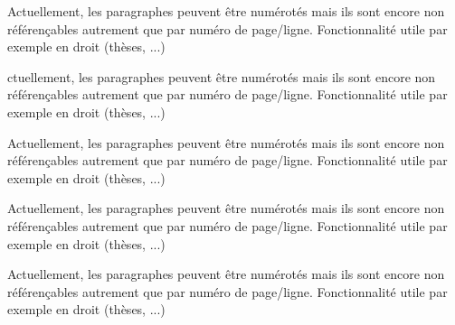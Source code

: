 \documentclass{article}
\begin{document}
\numberpstarttrue
\beginnumbering
\pstart
Actuellement, les paragraphes peuvent être numérotés mais ils sont encore non référençables autrement que par numéro de page/ligne. Fonctionnalité utile par exemple en droit (thèses, ...)
\pend

\pstart
{}ctuellement, les paragraphes peuvent être numérotés mais ils sont encore non référençables autrement que par numéro de page/ligne. Fonctionnalité utile par exemple en droit (thèses, ...)
\pend

\pstart
Actuellement, les paragraphes peuvent être numérotés mais ils sont encore non référençables autrement que par numéro de page/ligne. Fonctionnalité utile par exemple en droit (thèses, ...)
\pend

\pstart
Actuellement, les paragraphes peuvent être numérotés mais ils sont encore non référençables autrement que par numéro de page/ligne. Fonctionnalité utile par exemple en droit (thèses, ...)
\pend

\pstart
Actuellement, les paragraphes peuvent être numérotés mais ils sont encore non référençables autrement que par numéro de page/ligne. Fonctionnalité utile par exemple en droit (thèses, ...)
\pend
\endnumbering
\end{document}

